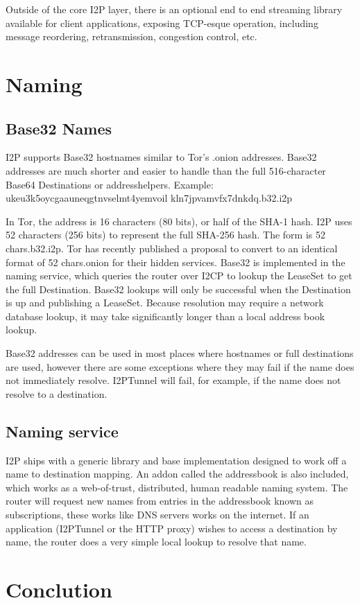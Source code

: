 \documentclass[a4paper,twocolumn,12pt]{article}
\begin{document}
Outside of the core I2P layer, there is an optional end to
end streaming library available for client applications, exposing TCP-esque operation,
including message reordering, retransmission, congestion control, etc.

\section{Naming}

\subsection{Base32 Names}

I2P supports Base32\cite{rfc4648} hostnames similar to Tor's\cite{tor-design} .onion
addresses. Base32 addresses are much shorter and easier to handle than the full
516-character Base64 Destinations or addresshelpers. Example:
ukeu3k5oycgaauneqgtnvselmt4yemvoil
kln7jpvamvfx7dnkdq.b32.i2p

In Tor\cite{tor-design}, the address is 16 characters (80 bits), or half of the
SHA-1 hash.  \cite{tor-hiddenservice} I2P uses 52 characters (256 bits) to
represent the full SHA-256 hash. The form is {52 chars}.b32.i2p.
Tor\cite{tor-design} has recently published a proposal to convert to an
identical format of {52 chars}.onion for their hidden services. Base32 is
implemented in the naming service, which queries the router over I2CP to lookup
the LeaseSet to get the full Destination. Base32 lookups will only be
successful when the Destination is up and publishing a LeaseSet. Because
resolution may require a network database lookup, it may take significantly
longer than a local address book lookup.

Base32 addresses can be used in most places where hostnames or full
destinations are used, however there are some exceptions where they may fail if
the name does not immediately resolve. I2PTunnel will fail, for example, if the
name does not resolve to a destination.

\subsection{Naming service}

I2P ships with a generic library and base implementation designed to work off a
name to destination mapping. An addon called the addressbook is also included,
which works as a web-of-trust, distributed, human readable naming system.
The router will request new names from entries in the addressbook known as
subscriptions, these works like DNS servers works on the internet.
If an application (I2PTunnel or the HTTP\cite{http-rfc} proxy) wishes to access a destination
by name, the router does a very simple local lookup to resolve that name.


\section{Conclution}




\end{document}
